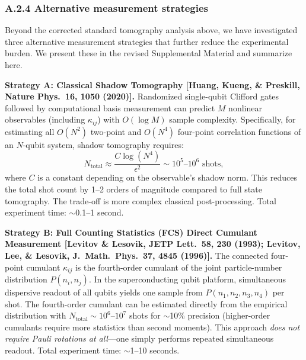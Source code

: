 \documentclass[11pt,a4paper]{article}
\begin{document}
\subsubsection*{A.2.4 Alternative measurement strategies}

Beyond the corrected standard tomography analysis above, we have investigated three alternative measurement strategies that further reduce the experimental burden. We present these in the revised Supplemental Material and summarize here.

\textbf{Strategy A: Classical Shadow Tomography [Huang, Kueng, \& Preskill, Nature Phys.\ 16, 1050 (2020)].}
Randomized single-qubit Clifford gates followed by computational basis measurement can predict $M$ nonlinear observables (including $\kappa_{ij}$) with $O(\log M)$ sample complexity. Specifically, for estimating all $O(N^2)$ two-point and $O(N^4)$ four-point correlation functions of an $N$-qubit system, shadow tomography requires:
\begin{equation}
N_{\text{total}} \approx \frac{C \log(N^4)}{\epsilon^2} \sim 10^5 \text{--} 10^6 \text{ shots},
\end{equation}
where $C$ is a constant depending on the observable's shadow norm. This reduces the total shot count by 1--2 orders of magnitude compared to full state tomography. The trade-off is more complex classical post-processing. Total experiment time: $\sim$0.1--1 second.

\textbf{Strategy B: Full Counting Statistics (FCS) Direct Cumulant Measurement [Levitov \& Lesovik, JETP Lett.\ 58, 230 (1993); Levitov, Lee, \& Lesovik, J.\ Math.\ Phys.\ 37, 4845 (1996)].}
The connected four-point cumulant $\kappa_{ij}$ is the fourth-order cumulant of the joint particle-number distribution $P(n_i, n_j)$. In the superconducting qubit platform, simultaneous dispersive readout of all qubits yields one sample from $P(n_1, n_2, n_3, n_4)$ per shot. The fourth-order cumulant can be estimated directly from the empirical distribution with $N_{\text{total}} \sim 10^6$--$10^7$ shots for $\sim$10\% precision (higher-order cumulants require more statistics than second moments). This approach \emph{does not require Pauli rotations at all}---one simply performs repeated simultaneous readout. Total experiment time: $\sim$1--10 seconds.
\end{document}
